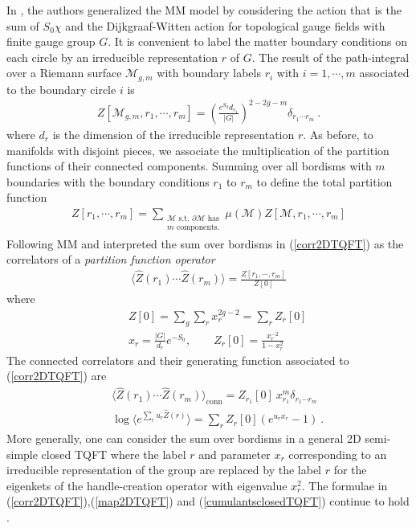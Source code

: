 \documentclass[a4paper,11pt]{article}
\theoremstyle{definition}
\numberwithin{equation}{section}
\newcommand{\lb}{\left(}
\newcommand{\rb}{\right)}
\newcommand{\p}{\partial}
\newcommand{\nn}{\nonumber}
\begin{document}
In \cite{gardiner20212D,banerjee2022comments}, the authors generalized the MM model by considering the action that is the sum of $S_0\chi$ and the Dijkgraaf-Witten action for topological gauge fields with finite gauge group $G$. It is convenient to label the matter boundary conditions on each circle by an irreducible representation $r$ of $G$. The result of the path-integral over a Riemann surface $\mathcal{M}_{g,m}$ with boundary labels $r_i$ with $i=1,\cdots, m$ associated to the boundary circle $i$ is \cite{gardiner20212D}
\begin{eqnarray}\label{dijWitt}
    Z[\mathcal{M}_{g,m},r_1,\cdots, r_m]= \lb\frac{e^{S_0}d_{r_1}}{|G|}\rb^{2-2g-m}\delta_{r_1\cdots r_m}\ .
\end{eqnarray}
where $d_r$ is the dimension of the irreducible representation $r$.
As before, to manifolds with disjoint pieces, we associate the multiplication of the partition functions of their connected components.
Summing over all bordisms with $m$ boundaries with the boundary conditions $r_1$ to $r_m$ to define the total partition function
\begin{eqnarray}\label{corr2DTQFT}
    Z[r_1,\cdots, r_m]=\sum_{\substack{\text{$\mathcal{M}$ s.t. $\p\mathcal{M}$ has}\\
     \text{$m$ components.}}}\mu(\mathcal{M})Z[\mathcal{M},r_1,\cdots, r_m]
\end{eqnarray}
Following MM \cite{gardiner20212D} and \cite{banerjee2022comments} interpreted the sum over bordisms in (\ref{corr2DTQFT}) as the correlators of a {\it partition function operator}
\begin{eqnarray}
    \langle \hat{Z}(r_1)\cdots \hat{Z}(r_m)\rangle=\frac{Z[r_1,\cdots,r_m]}{Z[0]}
\end{eqnarray}
where
\begin{eqnarray}\label{map2DTQFT}
    &&Z[0]=\sum_g\sum_rx_r^{2g-2}=\sum_rZ_r[0]\\\label{map2DTQFT2}
    &&x_r= \frac{|G|}{d_r} e^{-S_0},\qquad Z_r[0]= \frac{x_r^{-2}}{1-x_r^{2}}
\end{eqnarray}
The connected correlators and their generating function associated to (\ref{corr2DTQFT}) are
\begin{eqnarray}\label{cumulantsclosedTQFT}
    &&\langle \hat{Z}(r_1)\cdots \hat{Z}(r_m)\rangle_\text{conn}=Z_{r_1}[0]\: x_{r_1}^{m}\delta_{r_1\cdots r_m}\nn\\
    &&\log\langle e^{\sum_r u_r\hat{Z}(r)}\rangle=\sum_r Z_r[0]\lb e^{u_rx_r}-1\rb\ .
\end{eqnarray}
 More generally, one can consider the sum over bordisms in a general 2D semi-simple closed TQFT where the label $r$ and parameter $x_r$ corresponding to an irreducible representation of the group are replaced by the label $r$ for the eigenkets of the handle-creation operator with eigenvalue $x_r^2$. The formulae in (\ref{corr2DTQFT}),(\ref{map2DTQFT}) and (\ref{cumulantsclosedTQFT}) continue to hold \cite{gardiner20212D,banerjee2022comments}.
\end{document}
